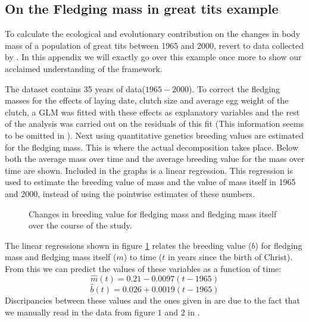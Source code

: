 \subsection{On the Fledging mass in great tits example}
To calculate the ecological and evolutionary contribution on the changes in body mass of a population of great tits between 1965 and 2000, \citet{Ellner2011} revert to data collected by \citet{Garant2004}. In this appendix we will exactly go over this example once more to show our acclaimed understanding of the framework.

The dataset contains 35 years of data($1965-2000$). To correct the fledging masses for the effects of laying date, clutch size and average egg weight of the clutch, a GLM was fitted with these effects as explanatory variables and the rest of the analysis was carried out on the residuals of this fit \citep{Garant2004} (This information seems to be omitted in \citet{Ellner2011}). Next using quantitative genetics breeding values are estimated for the fledging mass. This is where the actual decomposition takes place. Below both the average mass over time and the average breeding value for the mass over time are shown. Included in the graphs is a linear regression. This regression is used to estimate the breeding value of mass and the value of mass itself in 1965 and 2000, instead of using the pointwise estimates of these numbers.
\begin{figure}[h!]
\center
{}
\caption{Changes in  breeding value for fledging mass and  fledging mass itself over the course of the study.}
\label{appEl_fig1}
\end{figure}
The linear regressions shown in figure \ref{appEl_fig1} relates the breeding value ($b$) for fledging mass and fledging mass itself ($m$) to time ($t$ in years since the birth of Christ). From this we can predict the values of these variables as a function of time:
\begin{equation}
\hat{m}(t)=0.21-0.0097(t-1965)
\label{kappeq1}
\end{equation}
\begin{equation}
\hat{b}(t)=0.026+0.0019(t-1965)
\label{kappeq2}
\end{equation}
Discripancies between these values and the ones given in \citet{Ellner2011} are due to the fact that we manually read in the data from figure $1$ and $2$ in \citet{Garant2004}.

